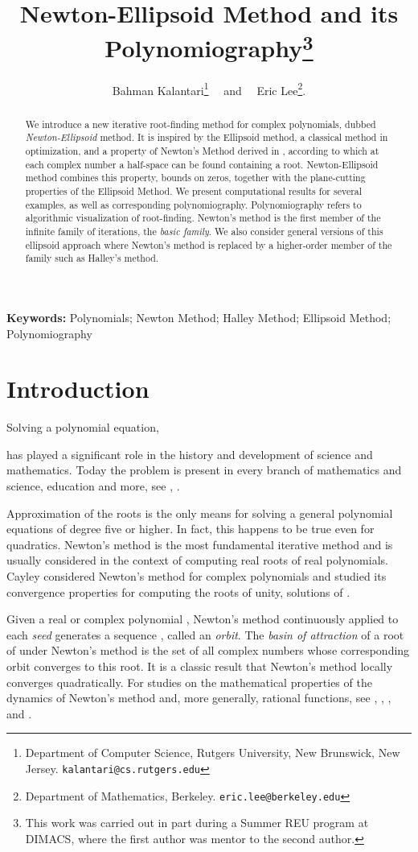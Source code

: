 \documentclass{article}
\title{Newton-Ellipsoid Method and its Polynomiography\thanks{This work was carried out in part during a Summer REU program at DIMACS, where the first author was mentor to the second author.}}
\author{Bahman Kalantari\thanks{Department of Computer Science,
        Rutgers University, New Brunswick, New Jersey. {\tt kalantari@cs.rutgers.edu}}
        ~~and~~ Eric Lee\thanks{Department of Mathematics,
        Berkeley. {\tt eric.lee@berkeley.edu}}.}
\date{}
\begin{document}
\maketitle
\begin{abstract}
 We introduce a new iterative root-finding method for complex polynomials, dubbed {\it Newton-Ellipsoid} method.  It is inspired by the Ellipsoid method, a classical method in optimization, and a property of Newton's Method derived in \cite{kalFTA}, according to which at each complex number a half-space can be found containing a root. Newton-Ellipsoid method combines this property, bounds on zeros, together with the plane-cutting properties of the Ellipsoid Method. We present computational results for several examples, as well as corresponding polynomiography. Polynomiography refers to algorithmic visualization of
 root-finding.  Newton's method is the first member of the infinite family of iterations, the {\it basic family}. We also consider general versions of this ellipsoid approach where Newton's method is replaced by a higher-order member of the family such as Halley's method.
\end{abstract}

{\bf Keywords:}    Polynomials; Newton Method; Halley Method; Ellipsoid Method; Polynomiography

\section{Introduction} Solving a polynomial equation,

has played a significant role in the history and development of science and mathematics.  Today the problem is present in every branch of mathematics and science, education and more, see \cite{pan97}, \cite{kalbook}.

Approximation of the roots is the only means for solving a general polynomial equations of degree five or higher. In fact, this happens to be true even for quadratics. Newton's method is the most fundamental iterative method and is usually considered in the context of  computing real roots of real polynomials. Cayley \cite{cay} considered Newton's method for complex polynomials and studied its convergence properties for computing the roots of unity, solutions of .

Given a real or complex polynomial , Newton's method continuously applied to each {\it seed}  generates a sequence , called an {\it orbit}.  The {\it basin of attraction} of  a root  of   under Newton's method is the set of all complex numbers whose corresponding orbit converges to this root. It is a classic result that Newton's method locally converges quadratically.  For studies on the mathematical properties of the dynamics of Newton's method and, more generally, rational functions, see \cite{beardon91}, \cite{milnor}, \cite{peit}, and \cite{kalbook}.
\end{document}
